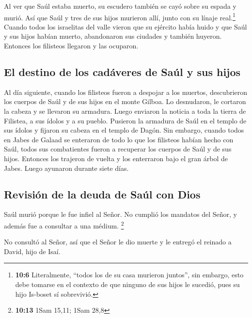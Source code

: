  Al ver que Saúl estaba muerto, su escudero también se
cayó sobre su espada y murió.  Así que Saúl y tres de sus
hijos murieron allí, junto con su línaje real.\footnote{\textbf{10:6}
  Literalmente, ``todos los de su casa murieron juntos'', sin embargo,
  esto debe tomarse en el contexto de que ninguno de sus hijos le
  sucedió, pues su hijo Is-boset sí sobrevivió.}  Cuando
todos los israelitas del valle vieron que su ejército había huido y que
Saúl y sus hijos habían muerto, abandonaron sus ciudades y también
huyeron. Entonces los filisteos llegaron y las ocuparon.

\hypertarget{el-destino-de-los-caduxe1veres-de-sauxfal-y-sus-hijos}{%
\subsection{El destino de los cadáveres de Saúl y sus
hijos}\label{el-destino-de-los-caduxe1veres-de-sauxfal-y-sus-hijos}}

 Al día siguiente, cuando los filisteos fueron a despojar
a los muertos, descubrieron los cuerpos de Saúl y de sus hijos en el
monte Gilboa.  Lo desnudaron, le cortaron la cabeza y se
llevaron su armadura. Luego enviaron la noticia a toda la tierra de
Filistea, a sus ídolos y a su pueblo.  Pusieron la
armadura de Saúl en el templo de sus ídolos y fijaron su cabeza en el
templo de Dagón.  Sin embargo, cuando todos en Jabes de
Galaad se enteraron de todo lo que los filisteos habían hecho con Saúl,
 todos sus combatientes fueron a recuperar los cuerpos de
Saúl y de sus hijos. Entonces los trajeron de vuelta y los enterraron
bajo el gran árbol de Jabes. Luego ayunaron durante siete días.

\hypertarget{revisiuxf3n-de-la-deuda-de-sauxfal-con-dios}{%
\subsection{Revisión de la deuda de Saúl con
Dios}\label{revisiuxf3n-de-la-deuda-de-sauxfal-con-dios}}

 Saúl murió porque le fue infiel al Señor. No cumplió los
mandatos del Señor, y además fue a consultar a una médium. \footnote{\textbf{10:13}
  1Sam 15,11; 1Sam 28,8}

 No consultó al Señor, así que el Señor le dio muerte y
le entregó el reinado a David, hijo de Isaí.

